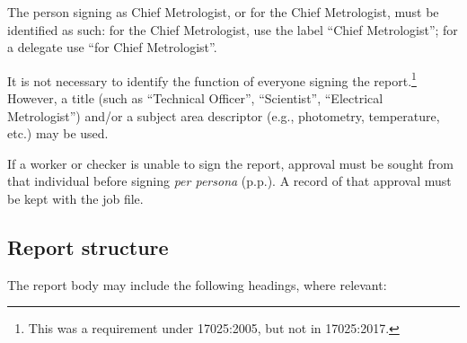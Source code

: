 The person signing as Chief Metrologist, or for the Chief Metrologist, must be identified as such:  for the Chief Metrologist, use the label ``Chief Metrologist''; for a delegate use ``for Chief Metrologist''.

It is not necessary to identify the function of everyone signing the report.\footnote{This was a requirement under 17025:2005, but not in 17025:2017.}  However, a title (such as ``Technical Officer'', ``Scientist'', ``Electrical Metrologist'') and/or a subject area descriptor (e.g., photometry, temperature, etc.) may be used.

If a worker or checker is unable to sign the report, approval must be sought from that individual before signing \textit{per persona} (p.p.). A record of that approval must be kept with the job file.

\subsection{Report structure}
The report body may include the following headings, where relevant:
